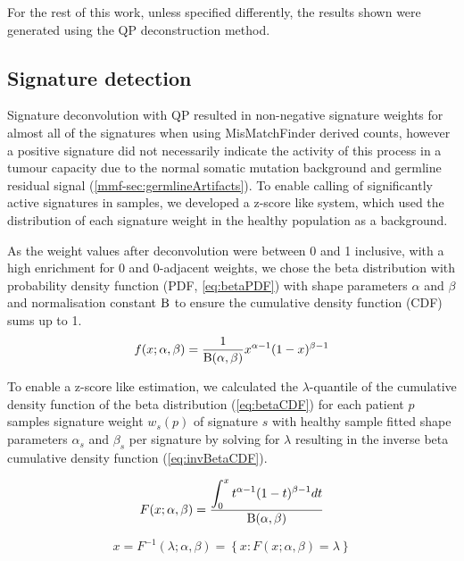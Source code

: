 For the rest of this work, unless specified differently, the results shown were generated using the QP deconstruction method.



\subsection{Signature detection}
\label{mmf-sec:sigdetection}
Signature deconvolution with QP resulted in non-negative signature weights for almost all of the signatures when using MisMatchFinder derived counts, however a positive signature did not necessarily indicate the activity of this process in a tumour capacity due to the normal somatic mutation background and germline residual signal (\autoref{mmf-sec:germlineArtifacts}). To enable calling of significantly active signatures in samples, we developed a z-score like system, which used the distribution of each signature weight in the healthy population as a background.

As the weight values after deconvolution were between 0 and 1 inclusive, with a high enrichment for 0 and 0-adjacent weights, we chose the beta distribution with probability density function (PDF, \autoref{eq:betaPDF}) with shape parameters $\alpha$ and $\beta$ and normalisation constant $\mathrm{B}$ to ensure the cumulative density function (CDF) sums up to 1. 
\begin{equation}
f(x; \alpha ,\beta)= \frac{1}{\mathrm{B}(\alpha, \beta)} x^{\alpha-1}(1-x)^{\beta-1}
\label{eq:betaPDF}
\end{equation}
\myequation[\ref{eq:betaPDF}]{Beta distribution probability density function}

To enable a z-score like estimation, we calculated the $\lambda$-quantile of the cumulative density function of the beta distribution (\autoref{eq:betaCDF}) for each patient $p$ samples signature weight $w_s(p)$ of signature $s$ with healthy sample fitted shape parameters $\alpha_s$ and $\beta_s$ per signature by solving  for $\lambda$ resulting in the inverse beta cumulative density function (\autoref{eq:invBetaCDF}). 

\begin{equation}
F(x; \alpha ,\beta) = \frac{\displaystyle\int_{0}^{x} t^{\alpha-1}(1-t)^{\beta-1} dt}{\mathrm{B}(\alpha, \beta)}
\label{eq:betaCDF} 
\end{equation}
\myequation[\ref{eq:betaCDF}]{Beta distribution cumulative density function}

\begin{equation}
x = F^{-1}(\lambda; \alpha ,\beta) = \left\{ x: F(x; \alpha, \beta) = \lambda \right\}
\label{eq:invBetaCDF} 
\end{equation}
\myequation[\ref{eq:invBetaCDF}]{Inverse beta distribution cumulative density function}


